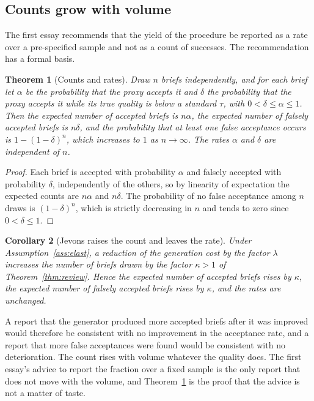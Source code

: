\documentclass[11pt]{article}
\theoremstyle{plain}
\newtheorem{theorem}{Theorem}[section]
\newtheorem{corollary}[theorem]{Corollary}
\theoremstyle{definition}
\theoremstyle{remark}
\begin{document}
\subsection{Counts grow with volume}

The first essay recommends that the yield of the procedure be reported as a rate over a pre-specified sample and not as a count of successes. The recommendation has a formal basis.

\begin{theorem}[Counts and rates]\label{thm:counts}
Draw $n$ briefs independently, and for each brief let $\alpha$ be the probability that the proxy accepts it and $\delta$ the probability that the proxy accepts it while its true quality is below a standard $\tau$, with $0<\delta\le\alpha\le1$. Then the expected number of accepted briefs is $n\alpha$, the expected number of falsely accepted briefs is $n\delta$, and the probability that at least one false acceptance occurs is $1-(1-\delta)^n$, which increases to $1$ as $n\to\infty$. The rates $\alpha$ and $\delta$ are independent of $n$.
\end{theorem}

\begin{proof}
Each brief is accepted with probability $\alpha$ and falsely accepted with probability $\delta$, independently of the others, so by linearity of expectation the expected counts are $n\alpha$ and $n\delta$. The probability of no false acceptance among $n$ draws is $(1-\delta)^n$, which is strictly decreasing in $n$ and tends to zero since $0<\delta\le1$. \qedhere
\end{proof}

\begin{corollary}[Jevons raises the count and leaves the rate]\label{cor:counts}
Under Assumption~\ref{ass:elast}, a reduction of the generation cost by the factor $\lambda$ increases the number of briefs drawn by the factor $\kappa>1$ of Theorem~\ref{thm:review}. Hence the expected number of accepted briefs rises by $\kappa$, the expected number of falsely accepted briefs rises by $\kappa$, and the rates are unchanged.
\end{corollary}

A report that the generator produced more accepted briefs after it was improved would therefore be consistent with no improvement in the acceptance rate, and a report that more false acceptances were found would be consistent with no deterioration. The count rises with volume whatever the quality does. The first essay's advice to report the fraction over a fixed sample is the only report that does not move with the volume, and Theorem~\ref{thm:counts} is the proof that the advice is not a matter of taste.
\end{document}
